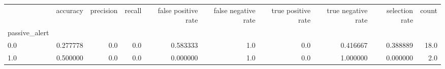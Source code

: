 \begin{tabular}{lrrrrrrrrr}
\toprule
{} &  accuracy &  precision &  recall &  false positive rate &  false negative rate &  true positive rate &  true negative rate &  selection rate &  count \\
passive\_alert &           &            &         &                      &                      &                     &                     &                 &        \\
\midrule
0.0           &  0.277778 &        0.0 &     0.0 &             0.583333 &                  1.0 &                 0.0 &            0.416667 &        0.388889 &   18.0 \\
1.0           &  0.500000 &        0.0 &     0.0 &             0.000000 &                  1.0 &                 0.0 &            1.000000 &        0.000000 &    2.0 \\
\bottomrule
\end{tabular}
